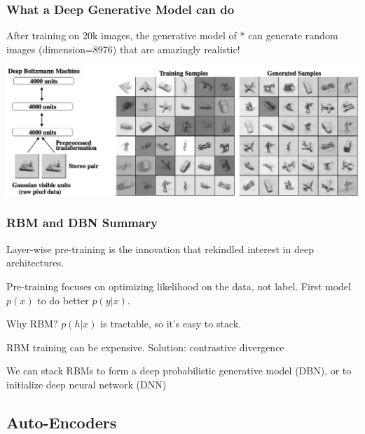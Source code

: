 \begin{frame}
\frametitle{What a Deep Generative Model can do}
After training on 20k images, the generative model of \cite{salakhutdinov09dbm}* can generate random images (dimension=8976) that are amazingly realistic!
\vspace{1cm} 
\centerline{\includegraphics[scale=0.17]{figs/dbm_generation}}
\end{frame}

\begin{frame}
\frametitle{RBM and DBN Summary}
\be
\item Layer-wise pre-training is the innovation that rekindled interest in deep architectures. \pause
\item Pre-training focuses on optimizing likelihood on the data, not label. First model $p(x)$ to do better $p(y|x)$. \pause
\item Why RBM? $p(h|x)$ is tractable, so it's easy to stack.\pause
\item RBM training can be expensive. Solution: contrastive divergence\pause
\item We can stack RBMs to form a deep probabilistic generative model (DBN), or to initialize deep neural network (DNN) 
\ee
\end{frame}


\subsection[Auto-Encoders]{Auto-Encoders}

